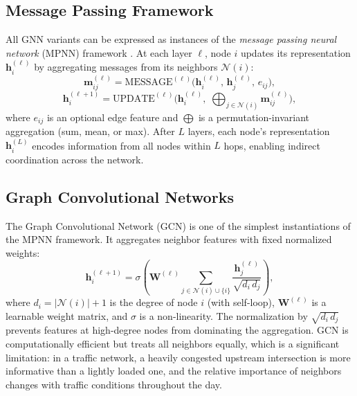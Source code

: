 \subsection{Message Passing Framework}
\label{sec:TheoreticalBackground_MessagePassing}

All GNN variants can be expressed as instances of the \emph{message passing neural network} (MPNN) framework \citep{gilmer2017neural}. At each layer $\ell$, node $i$ updates its representation $\mathbf{h}_i^{(\ell)}$ by aggregating messages from its neighbors $\mathcal{N}(i)$:
\begin{equation}
  \mathbf{m}_{ij}^{(\ell)} = \mathrm{MESSAGE}^{(\ell)}\!\bigl(\mathbf{h}_i^{(\ell)},\, \mathbf{h}_j^{(\ell)},\, e_{ij}\bigr),
  \label{eq:mpnn_message}
\end{equation}
\begin{equation}
  \mathbf{h}_i^{(\ell+1)} = \mathrm{UPDATE}^{(\ell)}\!\biggl(\mathbf{h}_i^{(\ell)},\; \bigoplus_{j \in \mathcal{N}(i)} \mathbf{m}_{ij}^{(\ell)}\biggr),
  \label{eq:mpnn_update}
\end{equation}
where $e_{ij}$ is an optional edge feature and $\bigoplus$ is a permutation-invariant aggregation (sum, mean, or max). After $L$ layers, each node's representation $\mathbf{h}_i^{(L)}$ encodes information from all nodes within $L$ hops, enabling indirect coordination across the network.

\subsection{Graph Convolutional Networks}
\label{sec:TheoreticalBackground_GCN}

The Graph Convolutional Network (GCN) \citep{kipf2017semi} is one of the simplest instantiations of the MPNN framework. It aggregates neighbor features with fixed normalized weights:
\begin{equation}
  \mathbf{h}_i^{(\ell+1)} = \sigma\!\left(\mathbf{W}^{(\ell)} \sum_{j \in \mathcal{N}(i) \cup \{i\}} \frac{\mathbf{h}_j^{(\ell)}}{\sqrt{d_i\, d_j}}\right),
  \label{eq:gcn}
\end{equation}
where $d_i = |\mathcal{N}(i)| + 1$ is the degree of node $i$ (with self-loop), $\mathbf{W}^{(\ell)}$ is a learnable weight matrix, and $\sigma$ is a non-linearity. The normalization by $\sqrt{d_i\, d_j}$ prevents features at high-degree nodes from dominating the aggregation. GCN is computationally efficient but treats all neighbors equally, which is a significant limitation: in a traffic network, a heavily congested upstream intersection is more informative than a lightly loaded one, and the relative importance of neighbors changes with traffic conditions throughout the day.

